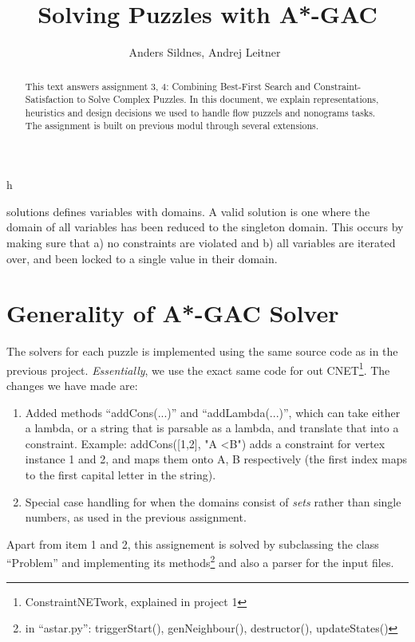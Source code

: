 \documentclass[journal]{IEEEtran}
\begin{document}
%
\title{Solving Puzzles with A*-GAC}

\author{Anders Sildnes, Andrej Leitner~%
}%

%
{h}

\maketitle

\begin{abstract}
    This text answers assignment 3, 4: Combining Best-First Search and Constraint-Satisfaction to Solve Complex Puzzles.  
    In this document, we explain representations, heuristics and design decisions we used to handle flow puzzels and nonograms tasks. 
    The assignment is built on previous modul through several extensions.
\end{abstract}

 solutions defines variables with domains.
A valid solution is one where the domain of all variables has been reduced to the
singleton domain. This occurs by making sure that a) no constraints are violated
and b) all variables are iterated over, and been locked to a single value in their
domain.

\section*{Generality of A*-GAC Solver}
The solvers for each puzzle is implemented using the same source code as in
the previous project. \textit{Essentially}, we use the exact same code for out 
CNET\footnote{ConstraintNETwork, explained in project 1}. The changes we have made
are:
\begin{enumerate}
    \item Added methods ``addCons(...)'' and ``addLambda(...)'', which can take
        either a lambda, or a string that is parsable as a lambda, and translate
        that into a constraint. 
        Example: addCons([1,2], "A \textless B") adds a constraint for vertex instance
        1 and 2, and maps them onto A, B respectively (the first index maps
        to the first capital letter in the string).
    \item Special case handling for when the domains consist of \textit{sets} rather
        than single numbers, as used in the previous assignment.
\end{enumerate}
Apart from item 1 and 2, this assignement is solved by subclassing the class
``Problem'' and implementing its methods\footnote{in ``astar.py'': triggerStart(), genNeighbour(), destructor(), updateStates()}
and also a parser for the input files.
\end{document}
